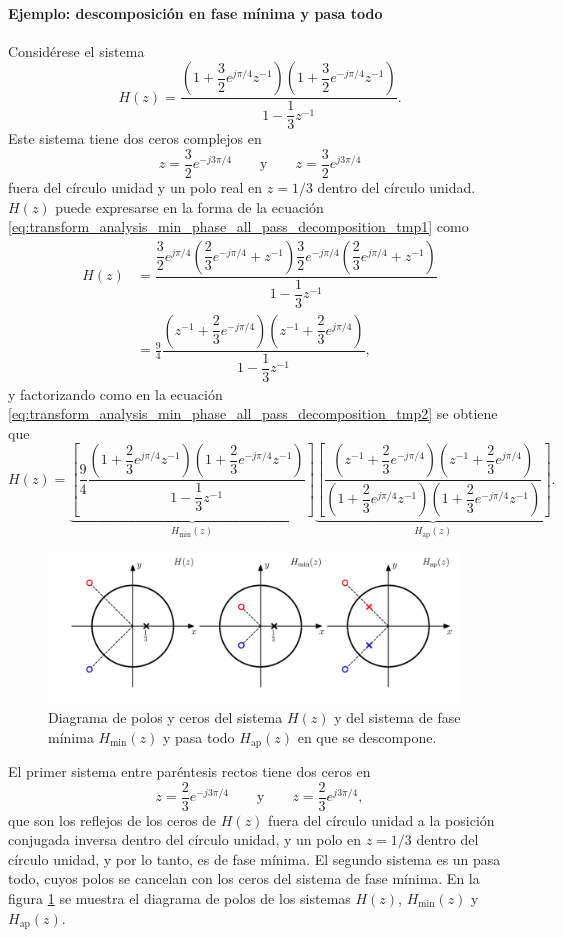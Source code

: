 \documentclass[a4paper]{report}
\begin{document}
\paragraph{Ejemplo: descomposición en fase mínima y pasa todo} Considérese el sistema
\[
 H(z)=\dfrac{\left(1+\dfrac{3}{2}e^{j\pi/4}z^{-1}\right)\left(1+\dfrac{3}{2}e^{-j\pi/4}z^{-1}\right)}{1-\dfrac{1}{3}z^{-1}}.
\]
Este sistema tiene dos ceros complejos en 
\[
 z=\frac{3}{2}e^{-j3\pi/4}
 \qquad\textrm{y}\qquad
 z=\frac{3}{2}e^{j3\pi/4}
\]
fuera del círculo unidad y un polo real en \(z=1/3\) dentro del círculo unidad. \(H(z)\) puede expresarse en la forma de la ecuación \ref{eq:transform_analysis_min_phase_all_pass_decomposition_tmp1} como
\begin{align*}
  H(z)&=\dfrac{\dfrac{3}{2}e^{j\pi/4}\left(\dfrac{2}{3}e^{-j\pi/4}+z^{-1}\right)\dfrac{3}{2}e^{-j\pi/4}\left(\dfrac{2}{3}e^{j\pi/4}+z^{-1}\right)}{1-\dfrac{1}{3}z^{-1}}\\
   &=\frac{9}{4}\dfrac{\left(z^{-1}+\dfrac{2}{3}e^{-j\pi/4}\right)\left(z^{-1}+\dfrac{2}{3}e^{j\pi/4}\right)}{1-\dfrac{1}{3}z^{-1}},
\end{align*}
y factorizando como en la ecuación \ref{eq:transform_analysis_min_phase_all_pass_decomposition_tmp2} se obtiene que 
\[
 H(z)=\underbrace{\left[\frac{9}{4}\dfrac{\left(1+\dfrac{2}{3}e^{j\pi/4}z^{-1}\right)\left(1+\dfrac{2}{3}e^{-j\pi/4}z^{-1}\right)}{1-\dfrac{1}{3}z^{-1}}\right]}_{\displaystyle H_\textrm{min}(z)}
 \underbrace{\left[\dfrac{\left(z^{-1}+\dfrac{2}{3}e^{-j\pi/4}\right)\left(z^{-1}+\dfrac{2}{3}e^{j\pi/4}\right)}{\left(1+\dfrac{2}{3}e^{j\pi/4}z^{-1}\right)\left(1+\dfrac{2}{3}e^{-j\pi/4}z^{-1}\right)}\right]}_{\displaystyle H_\textrm{ap}(z)}.
\]
\begin{figure}[!htb]
 \begin{center}
 \includegraphics[width=0.97\textwidth]{figuras/example_5_12_zero_pole_plot.pdf}
 \caption{\label{fig:example_5_12_zero_pole_plot} Diagrama de polos y ceros del sistema \(H(z)\) y del sistema de fase mínima \(H_\textrm{min}(z)\) y pasa todo \(H_\textrm{ap}(z)\) en que se descompone.}
 \end{center}
\end{figure}
El primer sistema entre paréntesis rectos tiene dos ceros en
\[
 z=\frac{2}{3}e^{-j3\pi/4}
 \qquad\textrm{y}\qquad
 z=\frac{2}{3}e^{j3\pi/4},
\]
que son los reflejos de los ceros de \(H(z)\) fuera del círculo unidad a la posición conjugada inversa dentro del círculo unidad, y un polo en \(z=1/3\) dentro del círculo unidad, y por lo tanto, es de fase mínima. El segundo sistema es un pasa todo, cuyos polos se cancelan con los ceros del sistema de fase mínima. En la figura \ref{fig:example_5_12_zero_pole_plot} se muestra el diagrama de polos de los sistemas \(H(z)\), \(H_\textrm{min}(z)\) y \(H_\textrm{ap}(z)\).
\end{document}
